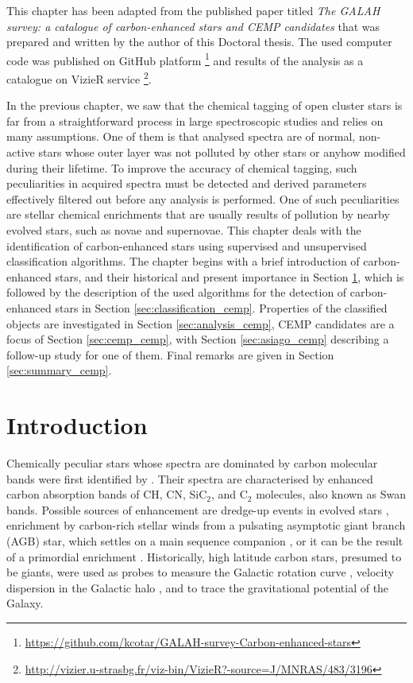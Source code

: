 This chapter has been adapted from the published paper titled \textit{The GALAH survey: a catalogue of carbon-enhanced stars and CEMP candidates} \cite{2019MNRAS.483.3196C} that was prepared and written by the author of this Doctoral thesis. The used computer code was published on GitHub platform  \footnote{\url{https://github.com/kcotar/GALAH-survey-Carbon-enhanced-stars}} and results of the analysis as a catalogue on VizieR service  \footnote{\url{http://vizier.u-strasbg.fr/viz-bin/VizieR?-source=J/MNRAS/483/3196}}.

In the previous chapter, we saw that the chemical tagging of open cluster stars is far from a straightforward process in large spectroscopic studies and relies on many assumptions. One of them is that analysed spectra are of normal, non-active stars whose outer layer was not polluted by other stars or anyhow modified during their lifetime. To improve the accuracy of chemical tagging, such peculiarities in acquired spectra must be detected and derived parameters effectively filtered out before any analysis is performed. One of such peculiarities are stellar chemical enrichments that are usually results of pollution by nearby evolved stars, such as novae and supernovae. This chapter deals with the identification of carbon-enhanced stars using supervised and unsupervised classification algorithms. The chapter begins with a brief introduction of carbon-enhanced stars, and their historical and present importance in Section \ref{sec:intro_cemp}, which is followed by the description of the used algorithms for the detection of carbon-enhanced stars in Section \ref{sec:classification_cemp}. Properties of the classified objects are investigated in Section \ref{sec:analysis_cemp}, CEMP candidates are a focus of Section \ref{sec:cemp_cemp}, with Section \ref{sec:asiago_cemp} describing a follow-up study for one of them. Final remarks are given in Section \ref{sec:summary_cemp}.

\section{Introduction}
\label{sec:intro_cemp}
Chemically peculiar stars whose spectra are dominated by carbon molecular bands were first identified by \citet{1869AN.....73..129S}. Their spectra are characterised by enhanced carbon absorption bands of CH, CN, SiC$_2$, and C$_{2}$ molecules, also known as Swan bands. Possible sources of enhancement are dredge-up events in evolved stars \citep{1983ApJ...275L..65I}, enrichment by carbon-rich stellar winds from a pulsating asymptotic giant branch (AGB) star, which settles on a main sequence companion \citep{1995MNRAS.277.1443H}, or it can be the result of a primordial enrichment \citep{2016ApJ...833...20Y}. Historically, high latitude carbon stars, presumed to be giants, were used as probes to measure the Galactic rotation curve \citep{2013Ap.....56...68B}, velocity dispersion in the Galactic halo \citep{1991AJ....101.2220B}, and to trace the gravitational potential of the Galaxy.  

